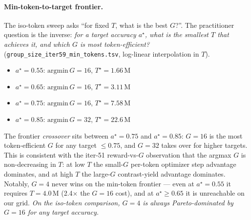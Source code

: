\paragraph{Min-token-to-target frontier.}
The iso-token sweep asks ``for fixed $T$, what is the best $G$?''.
The practitioner question is the inverse: \emph{for a target
accuracy $a^\star$, what is the smallest $T$ that achieves it, and
which $G$ is most token-efficient?}
(\texttt{group\_size\_iter59\_min\_tokens.tsv}, log-linear
interpolation in $T$).
\begin{itemize}
  \item $a^\star = 0.55$: $\mathrm{argmin}\,G = 16$, $T^\star = 1.66$\,M
  \item $a^\star = 0.65$: $\mathrm{argmin}\,G = 16$, $T^\star = 3.11$\,M
  \item $a^\star = 0.75$: $\mathrm{argmin}\,G = 16$, $T^\star = 7.58$\,M
  \item $a^\star = 0.85$: $\mathrm{argmin}\,G = 32$, $T^\star = 22.6$\,M
\end{itemize}
The frontier \emph{crossover} sits between $a^\star = 0.75$ and
$a^\star = 0.85$: $G{=}16$ is the most token-efficient $G$ for any
target $\leq 0.75$, and $G{=}32$ takes over for higher targets.  This
is consistent with the iter-51 reward-vs-$G$ observation that the
argmax $G$ is non-decreasing in $T$: at low $T$ the small-$G$ per-token
optimizer step advantage dominates, and at high $T$ the large-$G$
contrast-yield advantage dominates.  Notably, $G{=}4$ never wins on
the min-token frontier --- even at $a^\star = 0.55$ it requires
$T = 4.0$\,M (2.4$\times$ the $G{=}16$ cost), and at
$a^\star \geq 0.65$ it is unreachable on our grid.  \emph{On the
iso-token comparison, $G{=}4$ is always Pareto-dominated by
$G{=}16$ for any target accuracy.}

